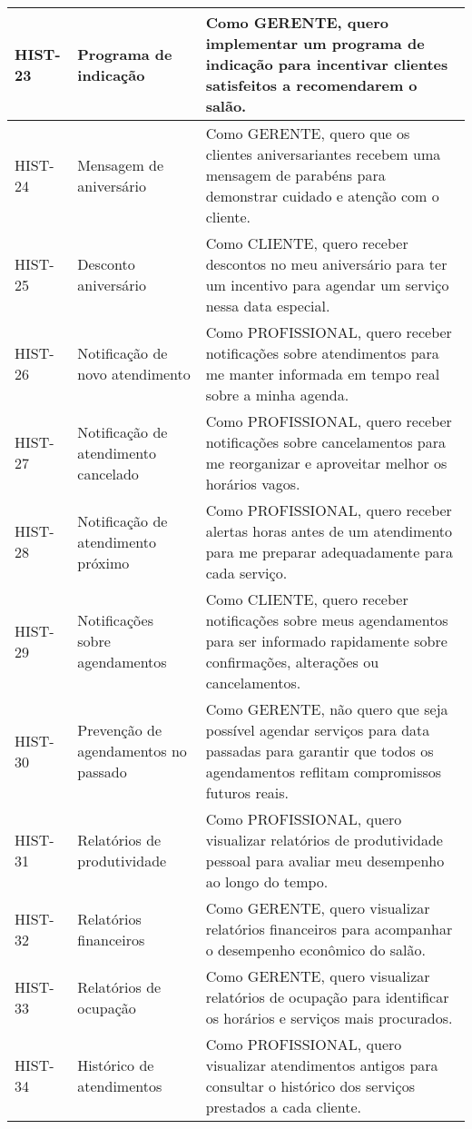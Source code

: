 \begin{longtable}{|p{2cm}|p{4cm}|p{9cm}|}
	HIST-23 & Programa de indicação & Como GERENTE, quero implementar um programa de indicação para incentivar clientes satisfeitos a recomendarem o salão. \\ \hline
	HIST-24 & Mensagem de aniversário & Como GERENTE, quero que os clientes aniversariantes recebem uma mensagem de parabéns para demonstrar cuidado e atenção com o cliente. \\ \hline
	HIST-25 & Desconto aniversário & Como CLIENTE, quero receber descontos no meu aniversário para ter um incentivo para agendar um serviço nessa data especial. \\ \hline
	HIST-26 & Notificação de novo atendimento & Como PROFISSIONAL, quero receber notificações sobre atendimentos para me manter informada em tempo real sobre a minha agenda. \\ \hline
	HIST-27 & Notificação de atendimento cancelado & Como PROFISSIONAL, quero receber notificações sobre cancelamentos para me reorganizar e aproveitar melhor os horários vagos. \\ \hline
	HIST-28 & Notificação de atendimento próximo & Como PROFISSIONAL, quero receber alertas horas antes de um atendimento para me preparar adequadamente para cada serviço. \\ \hline
	HIST-29 & Notificações sobre agendamentos & Como CLIENTE, quero receber notificações sobre meus agendamentos para ser informado rapidamente sobre confirmações, alterações ou cancelamentos. \\ \hline
	HIST-30 & Prevenção de agendamentos no passado & Como GERENTE, não quero que seja possível agendar serviços para data passadas para garantir que todos os agendamentos reflitam compromissos futuros reais. \\ \hline
	HIST-31 & Relatórios de produtividade & Como PROFISSIONAL, quero visualizar relatórios de produtividade pessoal para avaliar meu desempenho ao longo do tempo. \\ \hline
	HIST-32 & Relatórios financeiros & Como GERENTE, quero visualizar relatórios financeiros  para acompanhar o desempenho econômico do salão. \\ \hline
	HIST-33 & Relatórios de ocupação & Como GERENTE, quero visualizar relatórios de ocupação para identificar os horários e serviços mais procurados. \\ \hline
	HIST-34 & Histórico de atendimentos & Como PROFISSIONAL, quero visualizar atendimentos antigos para consultar o histórico dos serviços prestados a cada cliente. \\ \hline

\end{longtable}
